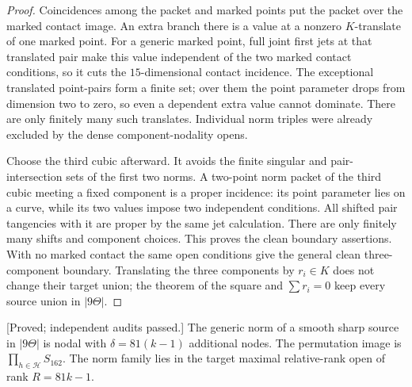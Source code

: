 \begin{proof}
Coincidences among the packet and marked points put the packet
over the marked contact image. An extra branch there is a value
at a nonzero $K$-translate of one marked point. For a generic
marked point, full joint first jets at that translated pair make
this value independent of the two marked contact conditions,
so it cuts the $15$-dimensional contact incidence. The exceptional
translated point-pairs form a finite set; over them the point
parameter drops from dimension two to zero, so even a dependent
extra value cannot dominate. There are only finitely many such
translates. Individual norm triples were already excluded by the
dense component-nodality opens.

Choose the third cubic afterward. It avoids the finite singular
and pair-intersection sets of the first two norms. A two-point
norm packet of the third cubic meeting a fixed component is a
proper incidence: its point parameter lies on a curve, while
its two values impose two independent conditions. All shifted
pair tangencies with it are proper by the same jet calculation.
There are only finitely many shifts and component choices.
This proves the clean boundary assertions. With no marked contact
the same open conditions give the general clean three-component
boundary. Translating the three components by $r_i\in K$ does
not change their target union; the theorem of the square and
$\sum r_i=0$ keep every source union in $|9\Theta|$.
\end{proof}

\begin{lemma}
\label{lem:nine-theta-node-product-candidate}
\textup{[Proved; independent audits passed.]}
The generic norm of a smooth sharp source in $|9\Theta|$ is nodal
with $\delta=81(k-1)$ additional nodes. The permutation image is
$\prod_{h\in\mathcal H}S_{162}$. The norm family lies in the
target maximal relative-rank open of rank $R=81k-1$.
\end{lemma}

